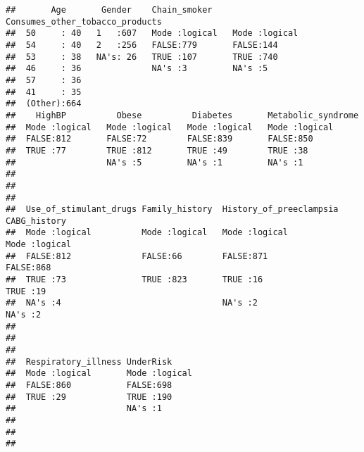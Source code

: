 \documentclass[
  spanish,
]{article}
\begin{document}
\begin{verbatim}
##       Age       Gender    Chain_smoker    Consumes_other_tobacco_products
##  50     : 40   1   :607   Mode :logical   Mode :logical                  
##  54     : 40   2   :256   FALSE:779       FALSE:144                      
##  53     : 38   NA's: 26   TRUE :107       TRUE :740                      
##  46     : 36              NA's :3         NA's :5                        
##  57     : 36                                                             
##  41     : 35                                                             
##  (Other):664                                                             
##    HighBP          Obese          Diabetes       Metabolic_syndrome
##  Mode :logical   Mode :logical   Mode :logical   Mode :logical     
##  FALSE:812       FALSE:72        FALSE:839       FALSE:850         
##  TRUE :77        TRUE :812       TRUE :49        TRUE :38          
##                  NA's :5         NA's :1         NA's :1           
##                                                                    
##                                                                    
##                                                                    
##  Use_of_stimulant_drugs Family_history  History_of_preeclampsia CABG_history   
##  Mode :logical          Mode :logical   Mode :logical           Mode :logical  
##  FALSE:812              FALSE:66        FALSE:871               FALSE:868      
##  TRUE :73               TRUE :823       TRUE :16                TRUE :19       
##  NA's :4                                NA's :2                 NA's :2        
##                                                                                
##                                                                                
##                                                                                
##  Respiratory_illness UnderRisk      
##  Mode :logical       Mode :logical  
##  FALSE:860           FALSE:698      
##  TRUE :29            TRUE :190      
##                      NA's :1        
##                                     
##                                     
## 
\end{verbatim}
\end{document}
